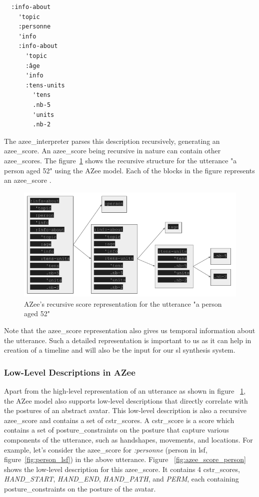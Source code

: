 \documentclass[../../main.tex]{subfiles}
\begin{document}
\begin{verbatim}
  :info-about
    'topic
    :personne
    'info
    :info-about
      'topic
      :âge
      'info
      :tens-units
        'tens
        .nb-5
        'units
        .nb-2
\end{verbatim}

The \gls{azee_interpreter} parses this description recursively, generating an \gls{azee_score}. An \gls{azee_score} being recursive in nature can contain other \gls{azee_score}s. The figure~\ref{fig:azee_score_example} shows the recursive structure for the \gls{utterance} "a person aged 52" using the AZee model. Each of the blocks in the figure represents an \gls{azee_score} .

\begin{figure}[h]
  \centering \includegraphics[width = 5in]{chapters/background_work/images/azee_score_example.png}
  \caption{AZee's recursive score representation for the utterance "a person aged 52"}
  \label{fig:azee_score_example}
\end{figure}

Note that the \gls{azee_score} representation also gives us temporal information about the \gls{utterance}. Such a detailed representation is important to us as it can help in creation of a timeline and will also be the input for our \gls{sl} synthesis system. 

\subsubsection{Low-Level Descriptions in AZee}
\label{ch:background_work:sign_language_descriptions:azee:low_level}

Apart from the high-level representation of an \gls{utterance} as shown in figure ~\ref{fig:azee_score_example}, the AZee model also supports low-level descriptions that directly correlate with the postures of an abstract avatar. This low-level description is also a recursive \gls{azee_score} and contains a set of \gls{cstr_score}s. A \gls{cstr_score} is a score which contains a set of \gls{posture_constraint}s on the posture that capture various components of the utterance, such as handshapes, movements, and locations. For example, let's consider the \gls{azee_score} for \emph{:personne} (person in \gls{lsf}, figure~\ref{fig:person_lsf}) in the above utterance. Figure ~\ref{fig:azee_score_person} shows the low-level description for this \gls{azee_score}. It contains 4 \gls{cstr_score}s, \emph{HAND\_START}, \emph{HAND\_END}, \emph{HAND\_PATH}, and \emph{PERM}, each containing \gls{posture_constraint}s on the posture of the avatar.
\end{document}
